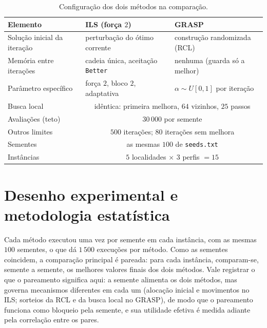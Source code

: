 \documentclass[11pt,a4paper]{article}
\newcommand{\code}[1]{\texttt{#1}}
\begin{document}
\begin{table}[htbp]
\centering
\caption{Configuração dos dois métodos na comparação.}
\label{tab:comp-config}
\renewcommand{\arraystretch}{1.2}
\begin{tabular}{@{}lll@{}}
\toprule
Elemento & ILS (força $2$) & GRASP \\
\midrule
Solução inicial da iteração & perturbação do ótimo corrente & construção randomizada (RCL) \\
Memória entre iterações & cadeia única, aceitação \code{Better} & nenhuma (guarda só a melhor) \\
Parâmetro específico & força $2$, bloco $2$, adaptativa & $\alpha \sim U[0,1]$ por iteração \\
Busca local & \multicolumn{2}{c}{idêntica: primeira melhora, $64$ vizinhos, $25$ passos} \\
Avaliações (teto) & \multicolumn{2}{c}{$30\,000$ por semente} \\
Outros limites & \multicolumn{2}{c}{$500$ iterações; $80$ iterações sem melhora} \\
Sementes & \multicolumn{2}{c}{as mesmas $100$ de \code{seeds.txt}} \\
Instâncias & \multicolumn{2}{c}{$5$ localidades $\times$ $3$ perfis $= 15$} \\
\bottomrule
\end{tabular}
\end{table}

\section{Desenho experimental e metodologia estatística}
\label{sec:comp-metodologia}

Cada método executou uma vez por semente em cada instância, com as mesmas $100$ sementes, o que dá $1\,500$ execuções por método. Como as sementes coincidem, a comparação principal é pareada: para cada instância, comparam-se, semente a semente, os melhores valores finais dos dois métodos. Vale registrar o que o pareamento significa aqui: a semente alimenta os dois métodos, mas governa mecanismos diferentes em cada um (alocação inicial e movimentos no ILS; sorteios da RCL e da busca local no GRASP), de modo que o pareamento funciona como bloqueio pela semente, e sua utilidade efetiva é medida adiante pela correlação entre os pares.
\end{document}
